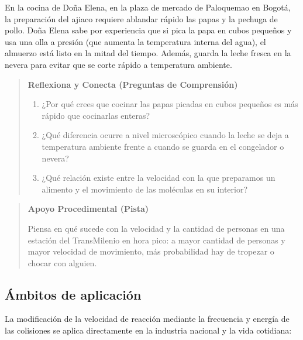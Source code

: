 \documentclass[
  spanish,
  letterpaper,
  12pt,
  oneside,
  open=any,
  DIV=15]{scrbook}
\providecommand{\tightlist}{%
  \setlength{\itemsep}{0pt}\setlength{\parskip}{0pt}}
\begin{document}
\begin{tcolorbox}
En la cocina de Doña Elena, en la plaza de mercado de Paloquemao en
Bogotá, la preparación del ajiaco requiere ablandar rápido las papas y
la pechuga de pollo. Doña Elena sabe por experiencia que si pica la papa
en cubos pequeños y usa una olla a presión (que aumenta la temperatura
interna del agua), el almuerzo está listo en la mitad del tiempo.
Además, guarda la leche fresca en la nevera para evitar que se corte
rápido a temperatura ambiente.

\begin{quote}
\textbf{Reflexiona y Conecta (Preguntas de Comprensión)}

\begin{enumerate}
\def\labelenumi{\arabic{enumi}.}
\tightlist
\item
  ¿Por qué crees que cocinar las papas picadas en cubos pequeños es más
  rápido que cocinarlas enteras?
\item
  ¿Qué diferencia ocurre a nivel microscópico cuando la leche se deja a
  temperatura ambiente frente a cuando se guarda en el congelador o
  nevera?
\item
  ¿Qué relación existe entre la velocidad con la que preparamos un
  alimento y el movimiento de las moléculas en su interior?
\end{enumerate}
\end{quote}

\begin{quote}
\textbf{Apoyo Procedimental (Pista)}

Piensa en qué sucede con la velocidad y la cantidad de personas en una
estación del TransMilenio en hora pico: a mayor cantidad de personas y
mayor velocidad de movimiento, más probabilidad hay de tropezar o chocar
con alguien.
\end{quote}

\subsection{Ámbitos de aplicación}\label{uxe1mbitos-de-aplicaciuxf3n-7}

La modificación de la velocidad de reacción mediante la frecuencia y
energía de las colisiones se aplica directamente en la industria
nacional y la vida cotidiana:


\end{tcolorbox}
\end{document}
